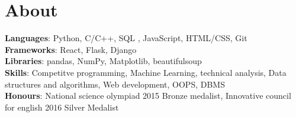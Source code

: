 \documentclass[letterpaper,11pt]{article}
\begin{document}
%
\section{About}
 \begin{itemize}[leftmargin=0.15in, label={}]
    \small{\item{
     \textbf{Languages}{: Python, C/C++, SQL , JavaScript, HTML/CSS, Git} \\
     \textbf{Frameworks}{: React, Flask, Django} \\
     \textbf{Libraries}{: pandas, NumPy, Matplotlib, beautifulsoup}\\
     \textbf{Skills}{: Competitve programming, Machine Learning, technical analysis, Data structures and algorithms, Web development, OOPS, DBMS}\\
     \textbf{Honours}{: National science olympiad 2015 Bronze medalist, Innovative council for english 2016 Silver Medalist}\\
    }}
 \end{itemize}


\end{document}
